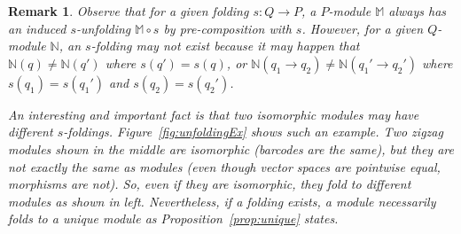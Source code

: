 \documentclass[11pt]{article}
\theoremstyle{plain}%
\newtheorem{remark}{Remark}[section]
\newcommand{\N}{\mathbb{N}}
\newcommand{\vecsp}{\mathbf{vec}_{\mathbb{F}}}
\newcommand{\M}{\mathbb{M}}
\newcommand{\Fld}{\mathrm{Fld}}
\begin{document}
\begin{remark}
Observe that for a given folding $s:Q\to P$, a $P$-module $\M$ always has an induced $s$-unfolding $\M\circ s$ by pre-composition with $s$. However, for a given $Q$-module $\N$, an $s$-folding may not exist because it may happen that $\N(q)\not =\N(q')$ where
$s(q')=s(q)$, or $\N(q_1\rightarrow q_2)\not = \N(q_1'\rightarrow q_2')$ where
$s(q_1)=s(q_1')$ and $s(q_2)=s(q_2')$.

An interesting and important fact is that two isomorphic modules 
may have different $s$-foldings. Figure~\ref{fig:unfoldingEx} shows such an example. 
Two zigzag modules shown in the middle are isomorphic (barcodes are the same), but they are not exactly the same as modules (even though vector spaces are pointwise equal, morphisms are not). 
So, even if
they are isomorphic, they fold to different modules as shown in left.
Nevertheless, if a folding exists, a module necessarily folds to a \emph{unique} module as
Proposition~\ref{prop:unique} states. 
\end{remark}
\end{document}
